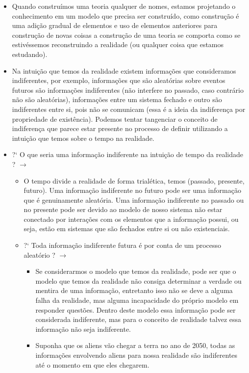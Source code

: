 \documentclass[10pt,a4paper]{report}
\begin{document}
\begin{itemize}
	\item[ (i) ] Quando construímos uma teoria qualquer de nomes, estamos projetando o conhecimento em um modelo que precisa ser construído, como construção é uma adição gradual de elementos e uso de elementos anteriores para construção de novas coisas a construção de uma teoria se comporta como se estivéssemos reconstruindo a realidade (ou qualquer coisa que estamos estudando).
	\item[ (ii) ] Na intuição que temos da realidade existem informações que consideramos indiferentes, por exemplo, informações que são aleatórias sobre eventos futuros são informações indiferentes (não interfere no passado, caso contrário não são aleatórias), informações entre um sistema fechado e outro são indiferentes entre si, pois não se comunicam (essa é a ideia da indiferença por propriedade de existência). Podemos tentar tangenciar o conceito de indiferença que parece estar presente no processo de definir utilizando a intuição que temos sobre o tempo na realidade.
	\item[ ] ?` O que seria uma informação indiferente na intuição de tempo da realidade ? $\rightarrow$
	\begin{itemize}
		\item[ (1) ] O tempo divide a realidade de forma trialética, temos (passado, presente, futuro). Uma informação indiferente no futuro pode ser uma informação que é genuinamente aleatória. Uma informação indiferente no passado ou no presente pode ser devido ao modelo de nosso sistema não estar conectado por interações com os elementos que a informação possui, ou seja, estão em sistemas que são fechados entre si ou não existenciais.
		\item[ ] ?` Toda informação indiferente futura é por conta de um processo aleatório ? $\rightarrow$
		\begin{itemize}
			\item[ (1) ] Se considerarmos o modelo que temos da realidade, pode ser que o modelo que temos da realidade não consiga determinar a verdade ou mentira de uma informação, entretanto isso não se deve a alguma falha da realidade, mas alguma incapacidade do próprio modelo em responder questões. Dentro deste modelo essa informação pode ser considerada indiferente, mas para o conceito de realidade talvez essa informação não seja indiferente.
			\item[ (2) ] Suponha que os aliens vão chegar a terra no ano de 2050, todas as informações envolvendo aliens para nossa realidade são indiferentes até o momento em que eles chegarem.

\end{itemize}
\end{itemize}
\end{itemize}
\end{document}
